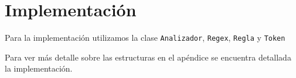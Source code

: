 \section{Implementaci\'on}

Para la implementaci\'on utilizamos la clase \texttt{Analizador}, \texttt{Regex}, \texttt{Regla} y \texttt{Token}

Para ver m\'as detalle sobre las estructuras en el ap\'endice se encuentra detallada la implementaci\'on.
